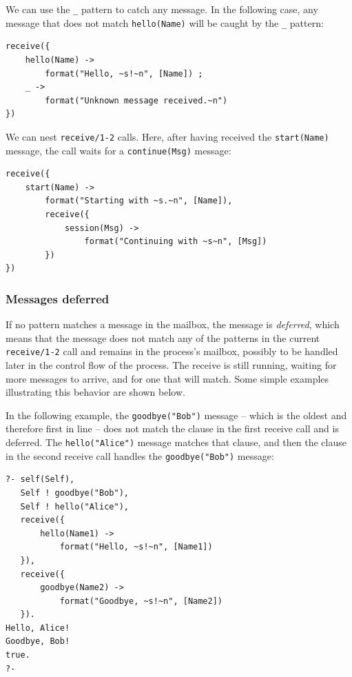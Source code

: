 \noindent We can use the \texttt{\_} pattern to catch any message. In the following case, any message that does not match \texttt{hello(Name)} will be caught by the \texttt{\_} pattern:

\begin{verbatim}
receive({
    hello(Name) ->
        format("Hello, ~s!~n", [Name]) ;
    _ ->
        format("Unknown message received.~n")
})
\end{verbatim}

\noindent We can nest \texttt{receive/1-2} calls. Here, after having received the \texttt{start(Name)} message, the call waits for a \texttt{continue(Msg)} message:

\begin{verbatim}
receive({
    start(Name) ->
        format("Starting with ~s.~n", [Name]),
        receive({
            session(Msg) ->
                format("Continuing with ~s~n", [Msg])
        })
})
\end{verbatim}

\noindent 

\subsubsection{Messages deferred}

If no pattern matches a message in the mailbox, the message is \textit{deferred}, which means that the message does not match any of the  patterns in the current \texttt{receive/1-2} call and remains in the process's mailbox, possibly to be handled later in the control flow of the process. The receive is still running, waiting for more messages to arrive, and for one that will match. Some simple examples illustrating this behavior are shown below.

In the following example, the \texttt{goodbye("Bob")} message -- which is the oldest and therefore first in line -- does not match the clause in the first receive call and is deferred. The \texttt{hello("Alice")} message matches that clause, and then the clause in the second receive call handles the \texttt{goodbye("Bob")} message:

\begin{verbatim}
?- self(Self),
   Self ! goodbye("Bob"),
   Self ! hello("Alice"),
   receive({
       hello(Name1) ->
           format("Hello, ~s!~n", [Name1])
   }),
   receive({
       goodbye(Name2) ->
           format("Goodbye, ~s!~n", [Name2])
   }).
Hello, Alice!
Goodbye, Bob!
true.
?-
\end{verbatim}

